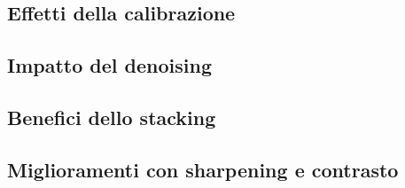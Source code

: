 \subsection{Effetti della calibrazione} \label{subsec:analysis_cal}

\subsection{Impatto del denoising} \label{subsec:analysis_den}

\subsection{Benefici dello stacking} \label{subsec:analysis_stack}

\subsection{Miglioramenti con sharpening e contrasto} \label{subsec:analisys_post}

\cleardoublepage